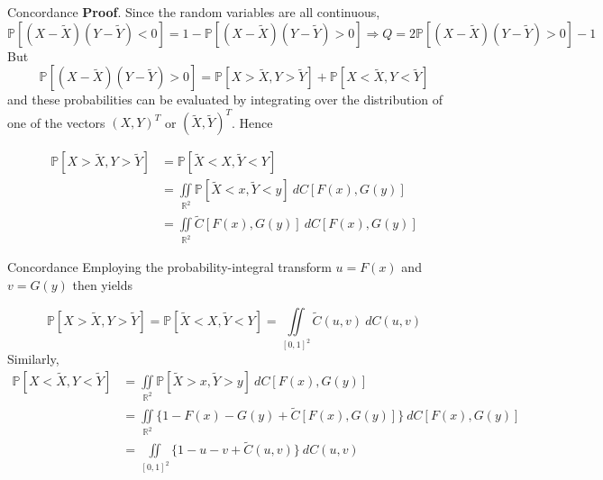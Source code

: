 \documentclass[11pt]{beamer}
\theoremstyle{plain}
\theoremstyle{definition}
\theoremstyle{remark}
\begin{document}
%
\begin{frame}{Concordance}
\textbf{Proof}. Since the random variables are all continuous,
\footnotesize
$$
\mathbb{P}[(X-\tilde X)(Y-\tilde Y) < 0] = 1 -\mathbb{P}[(X-\tilde X)(Y-\tilde Y) > 0] \Rightarrow Q = 2 
\mathbb{P}[(X-\tilde X)(Y-\tilde Y) > 0] - 1
$$
\normalsize
But
$$
\mathbb{P}[(X-\tilde X)(Y-\tilde Y) > 0] = \mathbb{P}[X > \tilde X, Y > \tilde Y] + \mathbb{P}[X <\tilde X, Y < \tilde Y]
$$
and these probabilities can be evaluated by integrating over the distribution of one of the vectors $(X, Y)^T$ or $(\tilde X, \tilde Y)^T$. Hence

\begin{equation}
\begin{split}
\mathbb{P}[X > \tilde X, Y > \tilde Y] & = \mathbb{P}[ \tilde X < X, \tilde Y < Y] \\
& = \iint\limits_{\mathbb{R}^2} \mathbb{P}[ \tilde X < x, \tilde Y < y] \> dC[F(x), G(y)] \\
& = \iint\limits_{\mathbb{R}^2} \tilde C [F(x), G(y)]  \> dC[F(x), G(y)]
\end{split}
\end{equation}

\end{frame}
%
\begin{frame}{Concordance}
Employing the probability-integral transform $u=F(x)$ and $v = G(y)$ then yields

\begin{equation}
\mathbb{P}[X > \tilde X, Y > \tilde Y] = \mathbb{P}[ \tilde X < X, \tilde Y < Y] 
= \iint\limits_{[0, 1]^2} \tilde C(u, v)  \> dC(u, v)
\end{equation}
Similarly,
\footnotesize
\begin{equation}
\begin{split}
\mathbb{P}[X < \tilde X, Y < \tilde Y] & = \iint\limits_{\mathbb{R}^2} \mathbb{P}[ \tilde X > x, \tilde Y > y] \> dC[F(x), G(y)] \\
& = \iint\limits_{\mathbb{R}^2} \bigl\{1 - F(x) - G(y) + \tilde C[F(x), G(y)]    \bigr\}  \> dC[F(x), G(y)] \\
& = \iint\limits_{[0, 1]^2} \bigl\{1 - u - v + \tilde C(u, v)   \bigr\}  \> dC(u, v)
\end{split}
\end{equation}
\normalsize
\end{frame}
\end{document}
